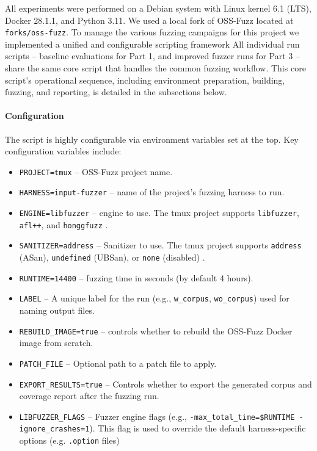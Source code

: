 \documentclass[11pt,a4paper,twocolumn]{article}
\begin{document}
All experiments were performed on a Debian system with Linux kernel 6.1 (LTS),
Docker 28.1.1, and Python 3.11. We used a local fork of OSS-Fuzz located at
\texttt{forks/oss-fuzz}. To manage the various fuzzing campaigns for this project we implemented a unified and configurable scripting framework  All individual run scripts -- baseline evaluations for Part 1, and improved fuzzer runs for Part 3 -- share the same core script that handles the common fuzzing workflow. This core script's operational sequence, including environment preparation, building, fuzzing, and reporting, is detailed in the subsections below.

\noindent \paragraph{Configuration} \label{sec:methodology_configuration} The script is highly configurable via environment variables set at the top. Key configuration variables include:
\begin{itemize}
	\item \texttt{PROJECT=tmux} -- OSS-Fuzz project name.
	\item \texttt{HARNESS=input-fuzzer} -- name of the project's fuzzing harness to run.
	\item \texttt{ENGINE=libfuzzer} -- engine to use. The tmux project supports \texttt{libfuzzer}, \texttt{afl++}, and \texttt{honggfuzz} \cite{oss-fuzz:tmux_project_yaml}.
	\item \texttt{SANITIZER=address} -- Sanitizer to use. The tmux project supports \texttt{address} (ASan), \texttt{undefined} (UBSan), or \texttt{none} (disabled) \cite{oss-fuzz:tmux_project_yaml}.
	\item \texttt{RUNTIME=14400} -- fuzzing time in seconds (by default 4 hours).
	\item \texttt{LABEL} -- A unique label for the run (e.g., \texttt{w\_corpus}, \texttt{wo\_corpus}) used for naming output files.
	\item \texttt{REBUILD\_IMAGE=true} -- controls whether to rebuild the OSS-Fuzz Docker image from scratch.
	\item \texttt{PATCH\_FILE} -- Optional path to a patch file to apply.
	\item \texttt{EXPORT\_RESULTS=true} -- Controls whether to export the generated corpus and coverage report after the fuzzing run.
	\item \texttt{LIBFUZZER\_FLAGS} -- Fuzzer engine flags (e.g., \texttt{-max\_total\_time=\$RUNTIME -ignore\_crashes=1}). This flag is used to override the default harness-specific options (e.g. \texttt{.option} files)
\end{itemize}
\end{document}
